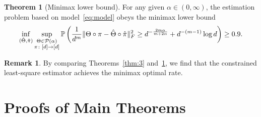 \documentclass[11pt]{article}
\theoremstyle{definition}
\newtheorem{thm}{Theorem}
\newtheorem{rmk}{Remark}
\begin{document}
\begin{thm}[Minimax lower bound]\label{thm:minimax}For any given $\alpha\in(0,\infty)$, the estimation problem based on model~\eqref{eq:model} obeys the minimax lower bound 
\[
\inf_{(\hat \Theta,\hat \pi)}\sup_{\substack{\Theta\in \mathcal{P}(\alpha)\\ \pi\colon[d]\to[d]}} \mathbb{P}\left({1\over d^m}\lVert\Theta\circ \pi-\hat \Theta\circ \hat \pi\rVert_F^2 \geq d^{-{2m\alpha\over m+2\alpha}}+d^{-(m-1)}\log d \right) \geq 0.9.
\]
\end{thm}
\begin{rmk} By comparing Theorems~\ref{thm:3} and~\ref{thm:minimax}, we find that the constrained least-square estimator achieves the minimax optimal rate. 
\end{rmk}

\section{Proofs of Main Theorems}
\end{document}
